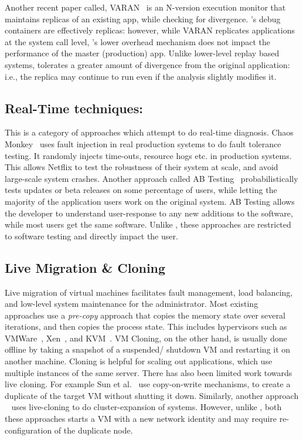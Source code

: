 Another recent paper called, VARAN~\cite{Hosek:2015:VUE:2694344.2694390} is an N-version execution monitor that maintains replicas of an existing app, while checking for divergence.
\parikshan's debug containers are effectively replicas: however, while VARAN replicates applications at the system call level, \parikshan's lower overhead mechanism does not impact the performance of the master (production) app.
Unlike lower-level replay based systems, \parikshan tolerates a greater amount of divergence from the original application: i.e., the replica may continue to run even if the analysis slightly modifies it.


\subsection{Real-Time techniques:}
\label{sec:relatedRealTime}

This is a category of approaches which attempt to do real-time diagnosis.
Chaos Monkey~\cite{chaosmonkey} uses fault injection in real production systems to do fault tolerance testing.
It randomly injects time-outs, resource hogs etc. in production systems. 
This allows Netflix to test the robustness of their system at scale, and avoid large-scale system crashes.  
Another approach called AB Testing~\cite{abtesting} probabilistically tests updates or beta releases on some percentage of users, 
while letting the majority of the application users work on the original system.
AB Testing allows the developer to understand user-response to any new additions to the software, while most users get the same software.
Unlike \parikshan, these approaches are restricted to software testing and directly impact the user.


\subsection{Live Migration \& Cloning}
Live migration of virtual machines facilitates fault management, load balancing, and low-level system maintenance for the administrator.
Most existing approaches use a \textit{pre-copy} approach that copies the memory state over several iterations, and then copies the process state.
This includes hypervisors such as VMWare~\cite{nelson2005fast}, Xen~\cite{clark2005live}, and KVM~\cite{kivity2007kvm}.
VM Cloning, on the other hand, is usually done offline by taking a snapshot of a suspended/ shutdown VM and restarting it on another machine.
Cloning is helpful for scaling out applications, which use multiple instances of the same server.
There has also been limited work towards live cloning. 
For example Sun et al.~\cite{Sun:2009:FLC:1581383.1582148} use copy-on-write mechanisms, to create a duplicate of the target VM without shutting it down.
Similarly, another approach ~\cite{gebhart2009dynamic} uses live-cloning to do cluster-expansion of systems.
However, unlike \parikshan, both these approaches starts a VM with a new network identity and may require re-configuration of the duplicate node.


